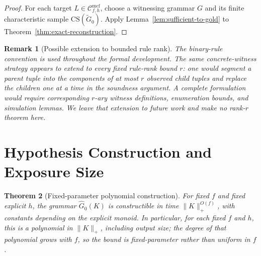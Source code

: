 \documentclass[11pt,a4paper]{article}
\newtheorem{theorem}{Theorem}[section]
\newtheorem{remark}[theorem]{Remark}
\theoremstyle{remark}
\newcommand{\CS}{\mathrm{CS}}
\newcommand{\Cmcf}[2]{\mathcal{C}^{\mathrm{mcf}}_{#1,#2}}
\begin{document}
\begin{proof}
For each target \(L\in\Cmcf{f}{h}\), choose a witnessing grammar \(G\) and its
finite characteristic sample \(\CS(\widetilde G_0)\).  Apply
Lemma~\ref{lem:sufficient-to-gold} to Theorem~\ref{thm:exact-reconstruction}.
\end{proof}

\begin{remark}[Possible extension to bounded rule rank]
\label{rem:bounded-rule-rank}
The binary-rule convention is used throughout the formal development.  The
same concrete-witness strategy appears to extend to every fixed rule-rank
bound \(r\): one would segment a parent tuple into the components of at most
\(r\) observed child tuples and replace the children one at a time in the
soundness argument.  A complete formulation would require corresponding
\(r\)-ary witness definitions, enumeration bounds, and simulation lemmas.  We
leave that extension to future work and make no rank-\(r\) theorem here.
\end{remark}



\section{Hypothesis Construction and Exposure Size}
\label{sec:poly-time}

\begin{theorem}[Fixed-parameter polynomial construction]
\label{thm:poly}
For fixed \(f\) and fixed explicit \(h\), the grammar \(\widehat G_0(K)\) is
constructible in time \(\|K\|_+^{O(f)}\), with constants depending on the
explicit monoid.  In particular, for each fixed \(f\) and \(h\), this is a
polynomial in \(\|K\|_+\), including output size; the degree of that polynomial
grows with \(f\), so the bound is fixed-parameter rather than uniform in
\(f\).
\end{theorem}
\end{document}
